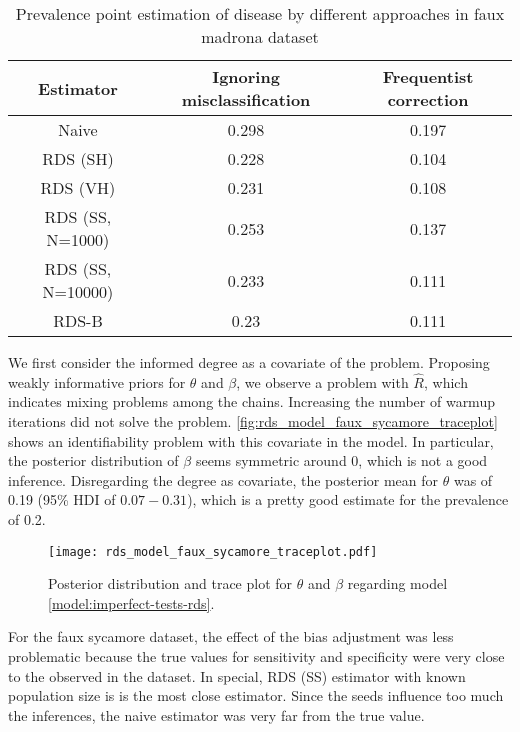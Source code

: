 \begin{table}[htbp]
    \centering
    \caption{\label{tab:results-estimators-faux-madrona-data}Prevalence point estimation of
    disease by different approaches in faux madrona dataset}
    \begin{tabular}{ccc}
    \hline
    Estimator & Ignoring misclassification & Frequentist correction \\ \hline
    Naive & 0.298 & 0.197 \\
    RDS (SH) & 0.228 & 0.104 \\
    RDS (VH) & 0.231 & 0.108 \\
    RDS (SS, N=1000) & 0.253 & 0.137 \\
    RDS (SS, N=10000) & 0.233 & 0.111 \\
    RDS-B & 0.23 & 0.111 \\ \hline
    \end{tabular}
\end{table}

We first consider the informed degree as a covariate of the problem. Proposing
weakly informative priors for $\theta$ and $\beta$, we observe a problem with
$\hat{R}$, which indicates mixing problems among the chains. Increasing the
number of warmup iterations did not solve the problem.
\autoref{fig:rds_model_faux_sycamore_traceplot} shows an identifiability
problem with this covariate in the model. In particular, the posterior
distribution of $\beta$ seems symmetric around 0, which is not a good
inference. Disregarding the degree as covariate, the posterior mean for $\theta$ was of
0.19 (95\% HDI of $0.07-0.31$), which is a pretty good estimate for the
prevalence of 0.2.

\begin{figure}
    \centering
    \caption{\label{fig:rds_model_faux_sycamore_traceplot}Posterior
    distribution and trace plot for $\theta$ and $\beta$ regarding model
    \eqref{model:imperfect-tests-rds}.}
    \texttt{[image: rds\_model\_faux\_sycamore\_traceplot.pdf]}
\end{figure}

For the faux sycamore dataset, the effect of the bias adjustment was less problematic
because the true values for sensitivity and specificity were very close to the
observed in the dataset. In special, RDS (SS) estimator with known population size is
is the most close estimator. Since the seeds influence too much the
inferences, the naive estimator was very far from the true value. 

